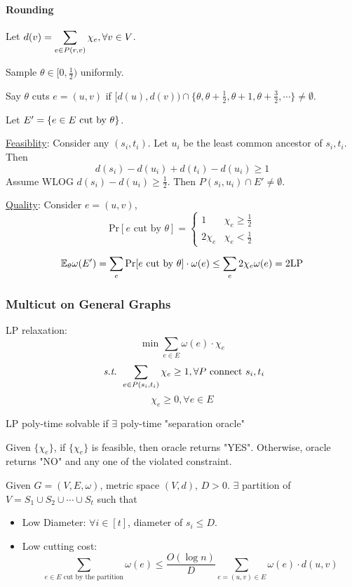 \paragraph{Rounding} Let  $ d(v)=\displaystyle\sum_{e\in P(r,v)}\chi_e,\forall v\in V $.

Sample  $ \theta\in [0,\frac{1}{2}) $ uniformly.

Say  $ \theta $ cuts  $ e=(u,v)  $ if  $ [d(u),d(v))\cap\{\theta,\theta+\frac{1}{2},\theta+1,\theta+\frac{3}{2},\cdots\}\neq \emptyset $.

Let   $ E'=\{e\in E\text{ cut by  $ \theta $}\} $.

\underline{Feasiblity}: Consider any  $ (s_i,t_i) $. Let  $ u_i $ be the least common ancestor of  $ s_i,t_i $.  Then 
\[d(s_i)-d(u_i)+d(t_i)-d(u_i) \geq 1\]
Assume WLOG  $ d(s_i)-d(u_i) \geq \frac{1}{2} $. Then  $ P(s_i,u_i)\cap E'\neq \emptyset $.

\underline{Quality}: Consider  $ e=(u,v) $,
\[\mathrm{Pr}[e\text{ cut by }\theta]=\begin{cases}
    1&\chi_e \geq \frac{1}{2}\\
    2\chi_e&\chi_e<\frac{1}{2}
\end{cases}\]

\[\mathbb E_\theta \omega(E')=\sum_e\mathrm{Pr}[e\text{ cut by }\theta]\cdot \omega(e) \leq \sum_e2\chi_e\omega(e)=2\mathrm{LP}\]


\subsubsection{Multicut on General Graphs}
LP relaxation:
\[\min \sum_{e\in E }\omega(e)\cdot\chi_e\]
\[\textit{ s.t. } \sum_{e\in P(s_i,t_i)}\chi_e \geq 1,\forall P \text{ connect }s_i,t_i\]
\[\chi_e \geq 0,\forall e\in E\]
\begin{theorem}
    LP poly-time solvable if  $ \exists  $ poly-time "separation oracle"
\end{theorem}
\begin{definition}
    Given  $ \{\chi_e\} $, if  $ \{\chi_e\} $ is feasible, then oracle returns "YES". Otherwise, oracle returns "NO" and any one of the violated constraint. 
\end{definition}

\begin{theorem}\label{thm:LDD} 
    Given  $ G=(V,E,\omega) $, metric space  $ (V,d) $,  $ D>0 $.  $ \exists  $ partition of  $ V=S_1\cup S_2\cup\cdots\cup S_t $ such that     
    \begin{itemize}
        \item Low Diameter:  $ \forall i\in [t] $, diameter of  $ s_i \leq D $.
        \item Low cutting cost:
        \[\sum_{e\in E\text{ cut by the partition}}\omega(e) \leq \frac{O(\log n)}{D}\sum_{e=(u,v)\in E}\omega(e)\cdot d(u,v)\]
    \end{itemize}
\end{theorem}


